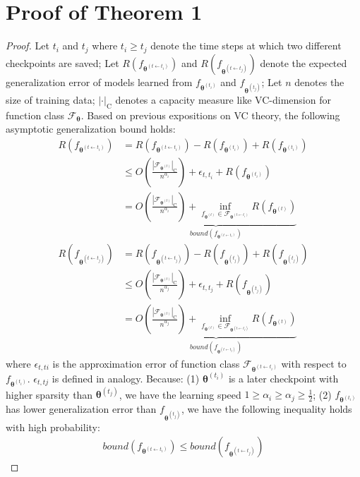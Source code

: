 \documentclass[11pt]{article}
\begin{document}
\section{Proof of Theorem 1}
\begin{proof}
		Let $t_i$ and $t_{j}$ where $t_{i}\geq t_{j}$ denote the time steps at which two different checkpoints are saved; Let $R(f_{\bm{\theta}^{(t\leftarrow t_i)}})$ and $R(f_{\bm{\theta}^{(t\leftarrow t_j)}})$ denote the expected generalization error of models learned from  $f_{\bm{\theta}^{(t_i)}}$ and $f_{\bm{\theta}^{(t_j)}}$; Let $n$ denotes the size of training data; $|\cdot|_{\text{C}}$ denotes a capacity measure like VC-dimension for function class $\mathcal{F}_{\bm{\theta}}$. Based on previous expositions on VC theory, the following asymptotic generalization bound holds:
	\begin{align}\nonumber
		R(f_{\bm{\theta}^{(t\leftarrow t_i)}})&=R(f_{\bm{\theta}^{(t\leftarrow t_i)}})-R(f_{\bm{\theta}^{(t_i)}})+R(f_{\bm{\theta}^{(t_i)}}) \\ \nonumber
		&\leq O(\frac{|\mathcal{F}_{\bm{\theta}^{(t)}}|_{\text{C}}}{n^{\alpha_{i}}})+ \epsilon_{t,t_i} + R(f_{\bm{\theta}^{(t_i)}}) \\ \nonumber 
		&=  \underbrace{O(\frac{|\mathcal{F}_{\bm{\theta}^{(t)}}|_{\text{C}}}{n^{\alpha_{i}}}) + \underset{f_{\bm{\theta}^{(t)}}\in \mathcal{F}_{\bm{\theta}^{(t\leftarrow t_i)}}}{\inf}R(f_{\bm{\theta}^{(t)}})}_{bound(f_{\bm{\theta}^{(t\leftarrow t_i)}})} \\ \nonumber
		R(f_{\bm{\theta}^{(t\leftarrow t_j)}})&=R(f_{\bm{\theta}^{(t\leftarrow t_j)}})-R(f_{\bm{\theta}^{(t_j)}})+R(f_{\bm{\theta}^{(t_j)}}) \\ \nonumber
		&\leq O(\frac{|\mathcal{F}_{\bm{\theta}^{(t)}}|_{\text{C}}}{n^{\alpha_{j}}})+ \epsilon_{t,t_j} + R(f_{\bm{\theta}^{(t_j)}}) \\ \nonumber 
		&=  \underbrace{O(\frac{|\mathcal{F}_{\bm{\theta}^{(t)}}|_{\text{C}}}{n^{\alpha_{j}}}) + \underset{f_{\bm{\theta}^{(t)}}\in \mathcal{F}_{\bm{\theta}^{(t\leftarrow t_j)}}}{\inf}R(f_{\bm{\theta}^{(t)}})}_{bound(f_{\bm{\theta}^{(t\leftarrow t_j)}})}
	\end{align}
	where $\epsilon_{t,ti}$ is the approximation error of function class $\mathcal{F}_{\bm{\theta}^{(t\leftarrow t_i)}}$ with respect to $f_{\bm{\theta}^{(t_i)}}$. $\epsilon_{t,tj}$ is defined in analogy.
	Because: (1) $\bm{\theta}^{(t_i)}$ is a later checkpoint with higher sparsity than $\bm{\theta}^{(t_j)}$, we have the learning speed $1\geq \alpha_{i}\geq \alpha_{j}\geq \frac{1}{2}$; (2) $f_{\bm{\theta}^{(t_i)}}$ has lower generalization error than $f_{\bm{\theta}^{(t_j)}}$, we have the following inequality holds with high probability:
	\begin{align}\nonumber
		bound(f_{\bm{\theta}^{(t\leftarrow t_i)}}) \leq bound(f_{\bm{\theta}^{(t\leftarrow t_j)}})
	\end{align}
\end{proof}
\end{document}
